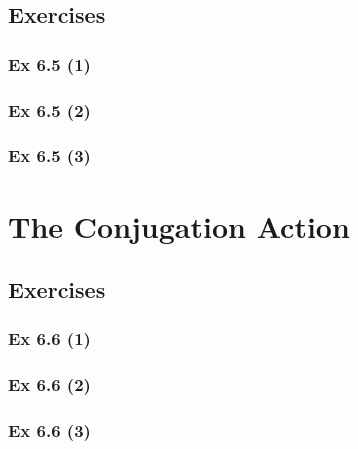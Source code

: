 \subsection{Exercises}\label{sec:6.5_Exercises}

\subsubsection{Ex 6.5 (1)}\label{sec:Ex_6.5.1}

\subsubsection{Ex 6.5 (2)}\label{sec:Ex_6.5.2}

\subsubsection{Ex 6.5 (3)}\label{sec:Ex_6.5.3}

\newpage		%

\section{The Conjugation Action}\label{sec:6.6}
\subsection{Exercises}\label{sec:6.6_Exercises}

\subsubsection{Ex 6.6 (1)}\label{sec:Ex_6.6.1}

\subsubsection{Ex 6.6 (2)}\label{sec:Ex_6.6.2}

\subsubsection{Ex 6.6 (3)}\label{sec:Ex_6.6.3}

